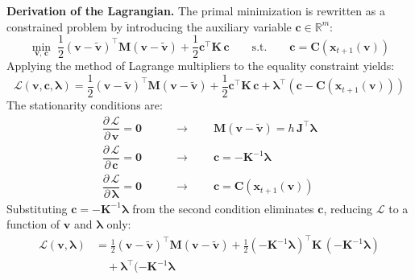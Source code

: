 \documentclass{article}
\newcommand{\pd}[2]{\dfrac{\partial\, #1}{\partial\, #2}}
\begin{document}
\begin{derivation}
\textbf{Derivation of the Lagrangian.}
The primal minimization is rewritten as a constrained problem by introducing 
the auxiliary variable $\mathbf{c} \in \mathbb{R}^m$:
%
\begin{equation*}
\min_{\mathbf{v},\, \mathbf{c}}\;
    \frac{1}{2}(\mathbf{v} - \tilde{\mathbf{v}})^\top \mathbf{M} (\mathbf{v} - \tilde{\mathbf{v}}) 
    + \frac{1}{2}\mathbf{c}^\top \mathbf{K}\, \mathbf{c}
    \qquad \text{s.t.} \qquad
    \mathbf{c} = \mathbf{C}(\mathbf{x}_{t+1}(\mathbf{v}))
\end{equation*}
%
Applying the method of Lagrange multipliers to the equality constraint yields:
%
\begin{equation*}
\mathcal{L}(\mathbf{v}, \mathbf{c}, \boldsymbol{\lambda}) = 
    \frac{1}{2}(\mathbf{v} - \tilde{\mathbf{v}})^\top \mathbf{M} (\mathbf{v} - \tilde{\mathbf{v}}) + 
    \frac{1}{2}\mathbf{c}^\top \mathbf{K}\, \mathbf{c} + 
    \boldsymbol{\lambda}^\top\!\left(\mathbf{c} - \mathbf{C}(\mathbf{x}_{t+1}(\mathbf{v}))\right)
\end{equation*}
%
The stationarity conditions are:
%
\begin{equation*}
\begin{aligned}
\pd{\mathcal{L}}{\mathbf{v}} = \mathbf{0} 
&\qquad\longrightarrow\qquad
\mathbf{M}(\mathbf{v} - \tilde{\mathbf{v}}) = h\,\mathbf{J}^\top \boldsymbol{\lambda} \\[4pt]
\pd{\mathcal{L}}{\mathbf{c}} = \mathbf{0} 
&\qquad\longrightarrow\qquad
\mathbf{c} = -\mathbf{K}^{-1}\boldsymbol{\lambda} \\[4pt]
\pd{\mathcal{L}}{\boldsymbol{\lambda}} = \mathbf{0} 
&\qquad\longrightarrow\qquad
\mathbf{c} = \mathbf{C}(\mathbf{x}_{t+1}(\mathbf{v}))
\end{aligned}
\end{equation*}
%
Substituting $\mathbf{c} = -\mathbf{K}^{-1}\boldsymbol{\lambda}$ from the second 
condition eliminates $\mathbf{c}$, reducing $\mathcal{L}$ to a function of 
$\mathbf{v}$ and $\boldsymbol{\lambda}$ only:
%
\begin{equation*}
\begin{aligned}
\mathcal{L}(\mathbf{v}, \boldsymbol{\lambda}) 
    &= \frac{1}{2}(\mathbf{v} - \tilde{\mathbf{v}})^\top \mathbf{M} (\mathbf{v} - \tilde{\mathbf{v}})
     + \frac{1}{2}(-\mathbf{K}^{-1}\boldsymbol{\lambda})^\top \mathbf{K}\,(-\mathbf{K}^{-1}\boldsymbol{\lambda})
     \\
    &\quad
     + \boldsymbol{\lambda}^\top(-\mathbf{K}^{-1}\boldsymbol{\lambda} 

\end{aligned}
\end{equation*}
\end{derivation}
\end{document}
